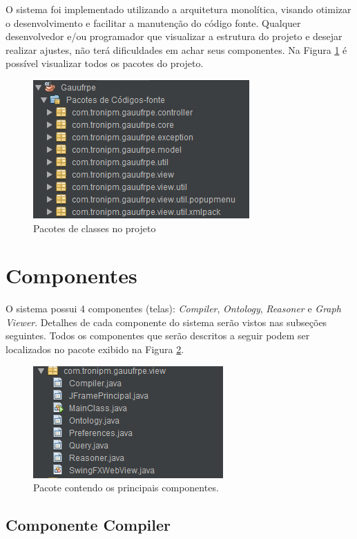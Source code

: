 \documentclass{bcc}
\begin{document}
O sistema foi implementado utilizando a arquitetura monolítica, visando otimizar o desenvolvimento e facilitar a manutenção do código fonte. Qualquer desenvolvedor e/ou programador que visualizar a estrutura do projeto e desejar realizar ajustes, não terá dificuldades em achar seus componentes. Na Figura \ref{fig:pacotesJava} é possível visualizar todos os pacotes do projeto.

\begin{figure}[H]
\centering
\includegraphics[width=.6\textwidth]{Figuras/estrutura.png}
\caption{Pacotes de classes no projeto}
\label{fig:pacotesJava}
\end{figure}

\section{Componentes}
O sistema possui 4 componentes (telas): \textit{Compiler}, \textit{Ontology}, \textit{Reasoner} e \textit{Graph Viewer}. Detalhes de cada componente do sistema serão vistos nas subseções seguintes. Todos os componentes que serão descritos a seguir podem ser localizados no pacote exibido na Figura \ref{fig:pacotesView}. 

\begin{figure}[H]
\centering
\includegraphics[width=.6\textwidth]{Figuras/pacote_view.png}
\caption{Pacote contendo os principais componentes.}
\label{fig:pacotesView}
\end{figure}

\subsection{Componente Compiler}
\end{document}
